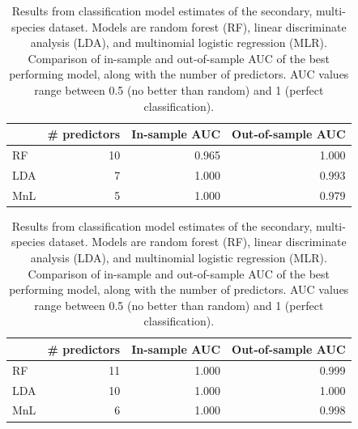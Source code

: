 \documentclass[12pt,letterpaper]{article}
\begin{document}
\begin{table}[ht]
  \begin{subtable}[t]{\linewidth}
    \begin{tabular}{ l r r r }
      \hline
      & \# predictors & In-sample AUC & Out-of-sample AUC \\ 
      \hline
      \hline
      RF &   10 & 0.965 & 1.000 \\ 
      LDA &    7 & 1.000 & 0.993 \\ 
      MnL &    5 & 1.000 & 0.979 \\ 
      \hline
    \end{tabular}
  \end{subtable}

  \begin{subtable}[t]{\linewidth}
    \begin{tabular}{ l r r r }
      \hline
      & \# predictors & In-sample AUC & Out-of-sample AUC \\ 
      \hline
      \hline
      RF &   11 & 1.000 & 0.999 \\ 
      LDA &   10 & 1.000 & 1.000 \\ 
      MnL &    6 & 1.000 & 0.998 \\ 
      \hline
    \end{tabular}
  \end{subtable}
  \caption{Results from classification model estimates of the secondary, multi-species dataset. Models are random forest (RF), linear discriminate analysis (LDA), and multinomial logistic regression (MLR). Comparison of in-sample and out-of-sample AUC of the best performing model, along with the number of predictors. AUC values range between 0.5 (no better than random) and 1 (perfect classification).}
  \label{tab:second_res}
\end{table}
\end{document}
